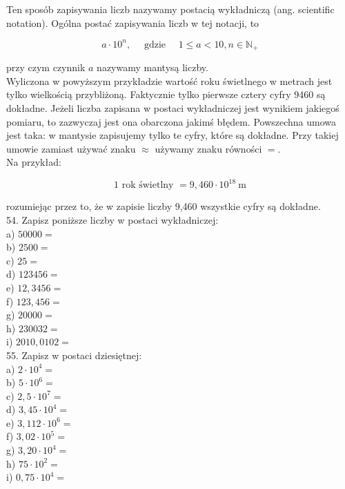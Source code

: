 \documentclass[10pt]{article}
\begin{document}
Ten sposób zapisywania liczb nazywamy postacią wykładniczą (ang. scientific notation). Ogólna postać zapisywania liczb w tej notacji, to

\[
a \cdot 10^{n}, \quad \text { gdzie } \quad 1 \leqslant a<10, n \in \mathbb{N}_{+}
\]

przy czym czynnik \(a\) nazywamy mantysą liczby.\\
Wyliczona w powyższym przykładzie wartość roku świetlnego w metrach jest tylko wielkością przybliżoną. Faktycznie tylko pierwsze cztery cyfry 9460 są dokładne. Jeżeli liczba zapisana w postaci wykładniczej jest wynikiem jakiegoś pomiaru, to zazwyczaj jest ona obarczona jakimś błędem. Powszechna umowa jest taka: w mantysie zapisujemy tylko te cyfry, które są dokładne. Przy takiej umowie zamiast używać znaku \(\approx\) używamy znaku równości \(=\).\\
Na przykład:

\[
1 \text { rok świetlny }=9,460 \cdot 10^{18} \mathrm{~m}
\]

rozumiejąc przez to, że w zapisie liczby 9,460 wszystkie cyfry są dokładne.\\
54. Zapisz poniższe liczby w postaci wykładniczej:\\
a) \(50000=\)\\
b) \(2500=\)\\
c) \(25=\)\\
d) \(123456=\)\\
e) \(12,3456=\)\\
f) \(123,456=\)\\
g) \(20000=\)\\
h) \(230032=\)\\
i) \(2010,0102=\)\\
55. Zapisz w postaci dziesiętnej:\\
a) \(2 \cdot 10^{4}=\)\\
b) \(5 \cdot 10^{6}=\)\\
c) \(2,5 \cdot 10^{7}=\)\\
d) \(3,45 \cdot 10^{4}=\)\\
e) \(3,112 \cdot 10^{6}=\)\\
f) \(3,02 \cdot 10^{5}=\)\\
g) \(3,20 \cdot 10^{4}=\)\\
h) \(75 \cdot 10^{2}=\)\\
i) \(0,75 \cdot 10^{4}=\)
\end{document}
